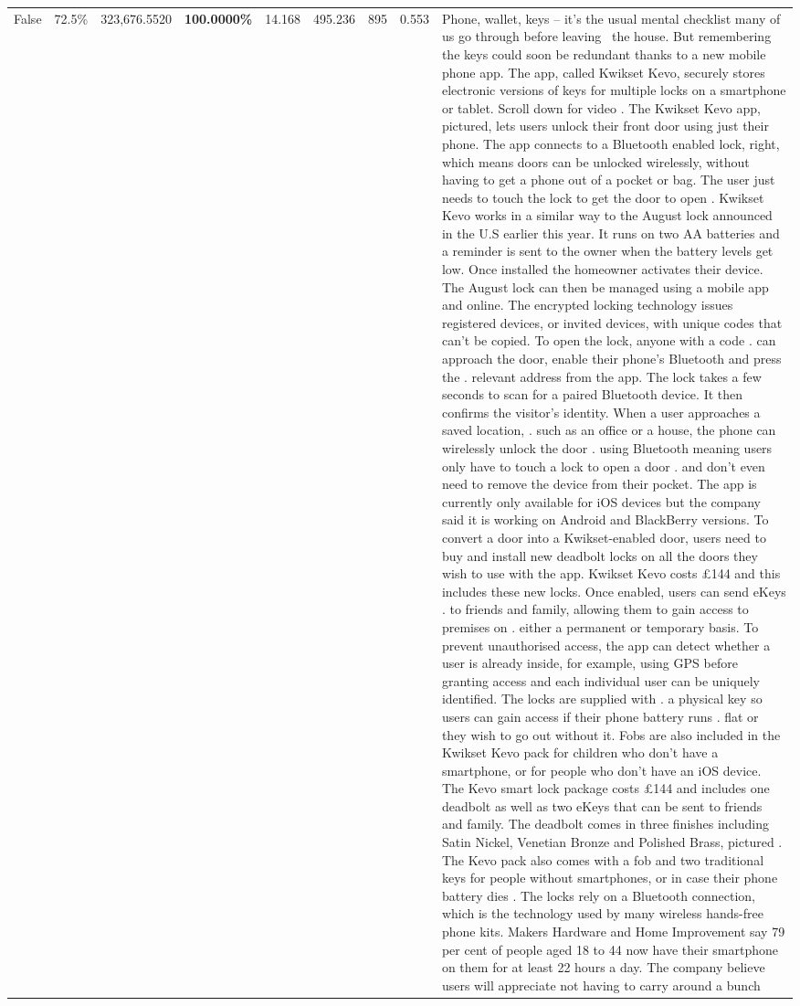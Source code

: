 \begin{table}[H]
\begin{tabular}{lllrlllll}
False & 72.5\% & 323,676.5520 & \bfseries \color{red} 100.0000\% & 14.168 & 495.236 & 895 & 0.553 & Phone, wallet, keys – it’s the usual mental checklist many of us go through before leaving  the house. But remembering the keys could soon be redundant thanks to a new mobile phone app. The app, called Kwikset Kevo, securely stores electronic versions of keys for multiple locks on a smartphone or tablet. Scroll down for video . The Kwikset Kevo app, pictured, lets users unlock their front door using just their phone. The app connects to a Bluetooth enabled lock, right, which means doors can be unlocked wirelessly, without having to get a phone out of a pocket or bag. The user just needs to touch the lock to get the door to open . Kwikset Kevo works in a similar way to the August lock announced in the U.S earlier this year. It runs on two AA batteries and a reminder is sent to the owner when the battery levels get low. Once installed the homeowner activates their device. The August lock can then be managed using a mobile app and online. The encrypted locking technology issues registered devices, or invited devices, with unique codes that can't be copied. To open the lock, anyone with a code . can approach the door, enable their phone's Bluetooth and press the . relevant address from the app. The lock takes a few seconds to scan for a paired Bluetooth device. It then confirms the visitor's identity. When a user approaches a saved location, . such as an office or a house, the phone can wirelessly unlock the door . using Bluetooth meaning users only have to touch a lock to open a door . and don't even need to remove the device from their pocket. The app is currently only available for iOS devices but the company said it is working on Android and BlackBerry versions. To convert a door into a Kwikset-enabled door, users need to buy and install new deadbolt locks on all the doors they wish to use with the app. Kwikset Kevo costs £144 and this includes these new locks. Once enabled, users can send eKeys . to friends and family, allowing them to gain access to premises on . either a permanent or temporary basis. To prevent unauthorised access, the app can detect whether a user is already inside, for example, using GPS before granting access and each individual user can be uniquely identified. The locks are supplied with . a physical key so users can gain access if their phone battery runs . flat or they wish to go out without it. Fobs are also included in the Kwikset Kevo pack for children who don't have a smartphone, or for people who don't have an iOS device. The Kevo smart lock package costs £144 and includes one deadbolt as well as two eKeys that can be sent to friends and family. The deadbolt comes in three finishes including Satin Nickel, Venetian Bronze and Polished Brass, pictured . The Kevo pack also comes with a fob and two traditional keys for people without smartphones, or in case their phone battery dies . The locks rely on a Bluetooth connection, which is the technology used by many wireless hands-free phone kits. Makers Hardware and Home Improvement say 79 per cent of people aged 18 to 44 now have their smartphone on them for at least 22 hours a day. The company believe users will appreciate not having to carry around a bunch 
\end{tabular}
\end{table}
